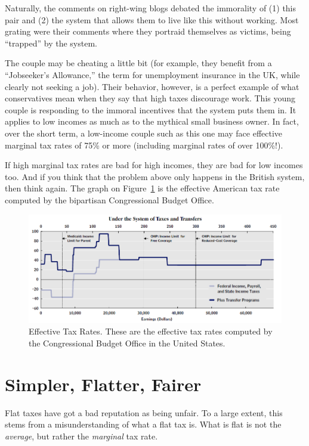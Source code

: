 Naturally, the comments on right-wing blogs debated the immorality of (1) this
pair and (2) the system that allows them to live like this without working.
Most grating were their comments where they portraid themselves as victims,
being ``trapped'' by the system.

The couple may be cheating a little bit (for example, they benefit from a
``Jobseeker's Allowance,'' the term for unemployment insurance in the UK, while
clearly not seeking a job). Their behavior, however, is a perfect example of
what conservatives mean when they say that high taxes discourage work. This
young couple is responding to the immoral incentives that the system puts them
in. It applies to low incomes as much as to the mythical small business owner.
In fact, over the short term, a low-income couple such as this one may face
effective marginal tax rates of 75\% or more (including marginal rates of over
100\%!).

If high marginal tax rates are bad for high incomes, they are bad for low
incomes too. And if you think that the problem above only happens in the
British system, then think again. The graph on
Figure~\ref{fig:cbo-effective-tax-rate} is the effective American tax rate
computed by the bipartisan Congressional Budget Office.

\begin{figure}
\begin{center}
\includegraphics[width=.8\textwidth]{images/cbo-effective-tax-rate.png}
\end{center}
\caption{Effective Tax Rates. These are the effective tax rates computed by the
Congressional Budget Office in the United States.}
\label{fig:cbo-effective-tax-rate}
\end{figure}

\section{Simpler, Flatter, Fairer}

Flat taxes have got a bad reputation as being unfair. To a large extent, this
stems from a misunderstanding of what a flat tax is. What is flat is not the
\emph{average}, but rather the \emph{marginal} tax rate.

